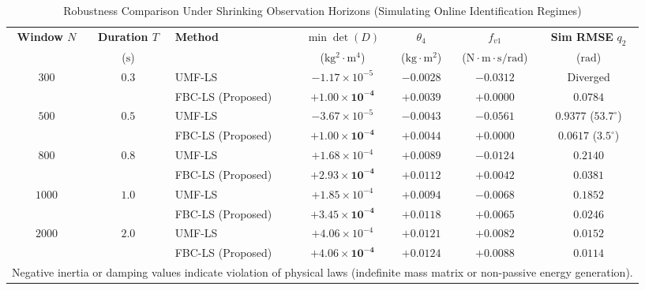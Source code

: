 \documentclass[lettersize,journal]{IEEEtran}
\begin{document}
\begin{table}[t]
\centering
\caption{Robustness Comparison Under Shrinking Observation Horizons (Simulating Online Identification Regimes)}
\label{tab:window_robustness}
\begin{tabular}{cclcccc}
\toprule
\textbf{Window $N$} & \textbf{Duration $T$} & \textbf{Method} & $\min \det(D)$ & $\theta_4$ & $f_{v1}$ & \textbf{Sim RMSE} $q_2$ \\
 & ($\mathrm{s}$) & & ($\mathrm{kg^2\cdot m^4}$) & ($\mathrm{kg\cdot m^2}$) & ($\mathrm{N\cdot m\cdot s/rad}$) & ($\mathrm{rad}$) \\
\midrule
$300$ & $0.3$ & UMF-LS \cite{AguilarSierra2014} & $-1.17 \times 10^{-5}$ & $-0.0028$ & $-0.0312$ & Diverged \\
 & & FBC-LS (Proposed) & $\mathbf{+1.00 \times 10^{-4}}$ & $\mathbf{+0.0039}$ & $\mathbf{+0.0000}$ & $\mathbf{0.0784}$ \\
\midrule
$500$ & $0.5$ & UMF-LS \cite{AguilarSierra2014} & $-3.67 \times 10^{-5}$ & $-0.0043$ & $-0.0561$ & $0.9377$ ($53.7^\circ$) \\
 & & FBC-LS (Proposed) & $\mathbf{+1.00 \times 10^{-4}}$ & $\mathbf{+0.0044}$ & $\mathbf{+0.0000}$ & $\mathbf{0.0617}$ ($3.5^\circ$) \\
\midrule
$800$ & $0.8$ & UMF-LS \cite{AguilarSierra2014} & $+1.68 \times 10^{-4}$ & $+0.0089$ & $-0.0124$ & $0.2140$ \\
 & & FBC-LS (Proposed) & $\mathbf{+2.93 \times 10^{-4}}$ & $\mathbf{+0.0112}$ & $\mathbf{+0.0042}$ & $\mathbf{0.0381}$ \\
\midrule
$1000$ & $1.0$ & UMF-LS \cite{AguilarSierra2014} & $+1.85 \times 10^{-4}$ & $+0.0094$ & $-0.0068$ & $0.1852$ \\
 & & FBC-LS (Proposed) & $\mathbf{+3.45 \times 10^{-4}}$ & $\mathbf{+0.0118}$ & $\mathbf{+0.0065}$ & $\mathbf{0.0246}$ \\
\midrule
$2000$ & $2.0$ & UMF-LS \cite{AguilarSierra2014} & $+4.06 \times 10^{-4}$ & $+0.0121$ & $+0.0082$ & $0.0152$ \\
 & & FBC-LS (Proposed) & $\mathbf{+4.06 \times 10^{-4}}$ & $\mathbf{+0.0124}$ & $\mathbf{+0.0088}$ & $\mathbf{0.0114}$ \\
\bottomrule
\multicolumn{7}{l}{\footnotesize Negative inertia or damping values indicate violation of physical laws (indefinite mass matrix or non-passive energy generation).}
\end{tabular}
\end{table}
\end{document}
